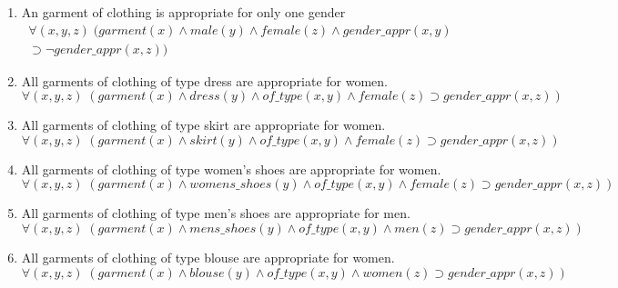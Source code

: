 \documentclass[paper=a4, fontsize=11pt]{scrartcl} %
\numberwithin{equation}{section} %
\numberwithin{figure}{section} %
\numberwithin{table}{section} %
\begin{document}
\begin{enumerate}
\item An garment of clothing is appropriate for only one gender
\begin{equation*}
	\begin{split}
	\forall(x,y,z) \; (garment(x) \land male(y) \land female(z) \land gender\_appr(x,y) \\ \supset \lnot gender\_appr(x,z))
	\end{split}
\end{equation*}

\item All garments of clothing of type dress are appropriate for women.
\begin{equation*}
	\forall(x,y,z) \; (garment(x) \land dress(y) \land of\_type(x,y) \land female(z) \supset gender\_appr(x,z)) 
\end{equation*}

\item All garments of clothing of type skirt are appropriate for women.
\begin{equation*}
	\forall(x,y,z) \; (garment(x) \land skirt(y) \land of\_type(x,y) \land female(z) \supset gender\_appr(x,z)) 
\end{equation*}

\item All garments of clothing of type women's shoes are appropriate for women.
\begin{equation*}
	\forall(x,y,z) \; (garment(x) \land womens\_shoes(y) \land of\_type(x,y) \land female(z) \supset gender\_appr(x,z)) 
\end{equation*}

\item All garments of clothing of type men's shoes are appropriate for men.
\begin{equation*}
	\forall(x,y,z) \; (garment(x) \land mens\_shoes(y) \land of\_type(x,y) \land men(z) \supset gender\_appr(x,z)) 
\end{equation*}

\item All garments of clothing of type blouse are appropriate for women.
\begin{equation*}
	\forall(x,y,z) \; (garment(x) \land blouse(y) \land of\_type(x,y) \land women(z) \supset gender\_appr(x,z)) 
\end{equation*}



\end{enumerate}
\end{document}
